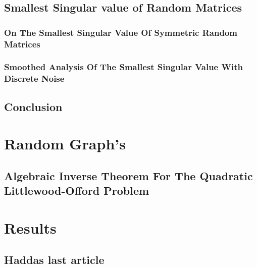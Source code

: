 \documentclass[12pt]{article}
\begin{document}
\subsection{Smallest Singular value of Random Matrices}



\subsubsection{On The Smallest Singular Value Of Symmetric Random Matrices}



\subsubsection{Smoothed Analysis Of The Smallest Singular Value With Discrete Noise}



\subsection{Conclusion}

\newpage
\section{Random Graph's}



\subsection{Algebraic Inverse Theorem For The
    Quadratic Littlewood-Offord Problem}



\section{Results}

\subsection{Haddas last article}



\newpage
\printbibliography
\end{document}
